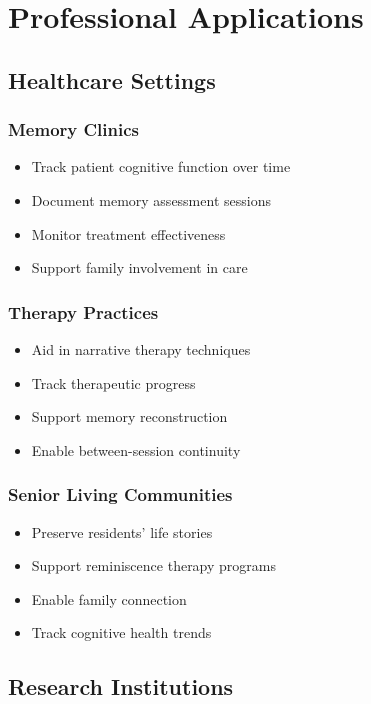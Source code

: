 \documentclass[11pt,letterpaper]{article}
\begin{document}
\newpage
\section{Professional Applications}

\subsection{Healthcare Settings}

\subsubsection{Memory Clinics}
\begin{itemize}[leftmargin=*]
    \item Track patient cognitive function over time
    \item Document memory assessment sessions
    \item Monitor treatment effectiveness
    \item Support family involvement in care
\end{itemize}

\subsubsection{Therapy Practices}
\begin{itemize}[leftmargin=*]
    \item Aid in narrative therapy techniques
    \item Track therapeutic progress
    \item Support memory reconstruction
    \item Enable between-session continuity
\end{itemize}

\subsubsection{Senior Living Communities}
\begin{itemize}[leftmargin=*]
    \item Preserve residents' life stories
    \item Support reminiscence therapy programs
    \item Enable family connection
    \item Track cognitive health trends
\end{itemize}

\subsection{Research Institutions}
\end{document}
